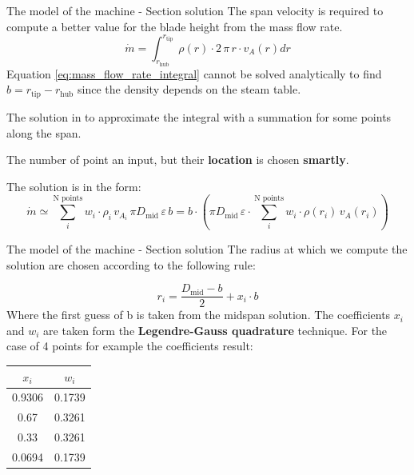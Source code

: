 \documentclass{beamer}
\newcommand{\myspace}[0]{\vspace{0.3cm}}
\newcommand{\myspaceneg}[0]{\vspace{-0.15cm}}
\newcommand{\dmid}{D_\text{mid}}
\newcommand{\highlightgreenC}[1]{\textcolor{chameleongreen3}{#1}}%
\begin{document}
\begin{frame}[t]{The model of the machine - Section solution}
The span velocity is required to compute a better value for the blade height from the mass flow rate.
\begin{equation}
\label{eq:mass_flow_rate_integral}
\dot{m} = \int_{r_\text{hub}}^{r_\text{tip}} \rho(r) \cdot 2 \, \pi \, r \cdot v_A(r) dr
\end{equation}
Equation \ref{eq:mass_flow_rate_integral} cannot be solved analytically to find $b = r_\text{tip} - r_\text{hub}$ since the density depends on the steam table.

The solution in to approximate the integral with a summation for some points along the span.

The number of point an input, but their \highlightgreenC{\textbf{location}} is chosen \highlightgreenC{\textbf{smartly}}.

\myspace
\myspaceneg
The solution is in the form:
\myspaceneg
\begin{equation}
\dot{m} \simeq \sum_i^{\text{N points}} w_i \cdot \rho_i \, v_{A_i} \, \pi \dmid \, \varepsilon \, b 
= b \cdot \left( \pi \dmid \, \varepsilon \cdot \sum_i^{\text{N points}} w_i \cdot \rho(r_i) \, v_{A}(r_i)  \right)
\end{equation}
\end{frame}

\begin{frame}[t]{The model of the machine - Section solution}
The radius at which we compute the solution are chosen according to the following rule:

\begin{equation}
r_i = \frac{\dmid - b}{ 2} +  x_i \cdot b
\end{equation}
Where the first guess of b is taken from the midspan solution.
The coefficients $x_i$ and $w_i$ are taken form the \highlightgreenC{\textbf{Legendre-Gauss quadrature}} technique.
For the case of 4 points for example the coefficients result:
\begin{center}
\begin{tabular}{|c|c|}
\hline 
$x_i$ & $w_i$ \\ 
\hline 
0.9306 & 0.1739 \\ 
\hline 
0.67 & 0.3261 \\ 
\hline 
0.33 & 0.3261 \\ 
\hline 
0.0694 & 0.1739 \\ 
\hline 
\end{tabular} 
\end{center}
\end{frame}
\end{document}
